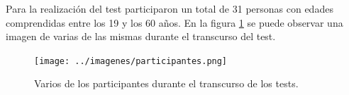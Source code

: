 \documentclass[11pt,a4paper,twoside]{book}
\begin{document}
                Para la realización del test participaron un total de 31 personas con edades comprendidas entre los 19 y los 60 años. En la figura \ref{fig:participantes} se puede observar una imagen de varias de las mismas durante el transcurso del test.
                
                \begin{figure}
                    \texttt{[image: ../imagenes/participantes.png]}
			        \centering
			        \caption{Varios de los participantes durante el transcurso de los tests.}
			        \label{fig:participantes}
                \end{figure}
            
            


\end{document}
